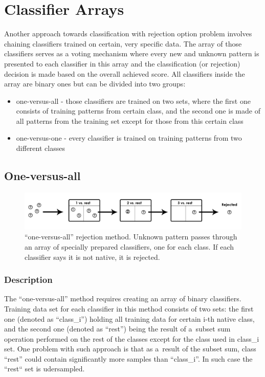 \section{Classifier Arrays}

Another approach towards classification with rejection option problem involves chaining classifiers trained on certain, very specific data. The array of those classifiers serves as a voting mechanism where every new and unknown pattern is presented to each classifier in this array and the classification (or rejection) decision is made based on the overall achieved score. All classifiers inside the array are binary ones but can be divided into two groups:
\begin{itemize}
	\item one-versus-all - those classifiers are trained on two sets, where the first one consists of training patterns from certain class, and the second one is made of all patterns from the training set except for those from this certain class
	\item one-versus-one - every classifier is trained on training patterns from two different classes
\end{itemize}

\subsection{One-versus-all}

\begin{figure}[htp]
	\centering
	\includegraphics[width=1\textwidth]{Figures/classification_with_rejection1.jpg}
	\caption{``one-versus-all'' rejection method. Unknown pattern passes through an array of specially prepared classifiers, one for each class. If each classifier says it is not native, it is rejected. }
	\label{fig:rejection_version1}\vspace{-3pt}
\end{figure}

\subsubsection{Description}

The ``one-versus-all'' method requires creating an array of binary classifiers. Training data set for each classifier in this method consists of two sets: the first one (denoted as ``class\_i'') holding all training data for certain i-th native class, and the second one (denoted as ``rest'') being the result of a~subset sum operation performed on the rest of the classes except for the class used in class\_i set. One problem with such approach is that as a~result of the subset sum, class ``rest'' could contain significantly more samples than ``class\_i''. In such case the ``rest`` set is udersampled. 

